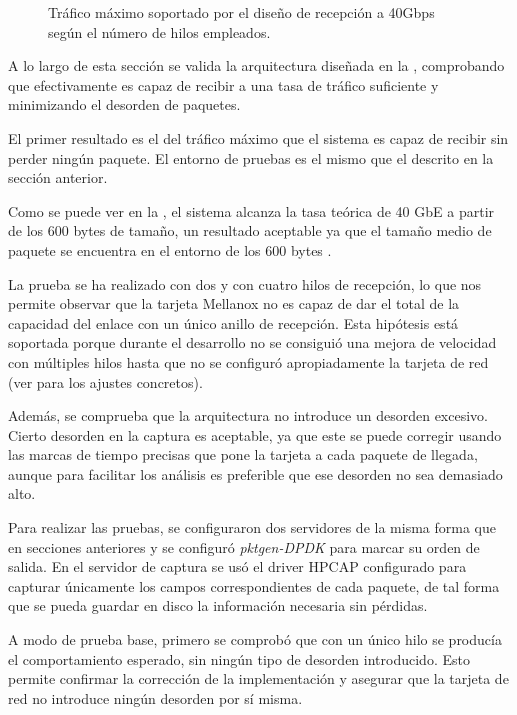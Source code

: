 \documentclass[oneside, draft]{epstfg}
\begin{document}
\begin{figure}[b]
\caption[Capacidad del diseño de recepción a 40 Gbps]{Tráfico máximo soportado por el diseño de recepción a 40Gbps según el número de hilos empleados.}
\label{fig:Validacion:MulticoreMaxRate}
\end{figure}

A lo largo de esta sección se valida la arquitectura diseñada en la , comprobando que efectivamente es capaz de recibir a una tasa de tráfico suficiente y minimizando el desorden de paquetes.

El primer resultado es el del tráfico máximo que el sistema es capaz de recibir sin perder ningún paquete. El entorno de pruebas es el mismo que el descrito en la sección anterior.

Como se puede ver en la , el sistema alcanza la tasa teórica de 40 GbE a partir de los 600 bytes de tamaño, un resultado aceptable ya que el tamaño medio de paquete se encuentra en el entorno de los 600 bytes \cite{john2007analysis}.

La prueba se ha realizado con dos y con cuatro hilos de recepción, lo que nos permite observar que la tarjeta Mellanox no es capaz de dar el total de la capacidad del enlace con un único anillo de recepción. Esta hipótesis está soportada porque durante el desarrollo no se consiguió una mejora de velocidad con múltiples hilos hasta que no se configuró apropiadamente la tarjeta de red (ver  para los ajustes concretos).

Además, se comprueba que la arquitectura no introduce un desorden excesivo. Cierto desorden en la captura es aceptable, ya que este se puede corregir usando las marcas de tiempo precisas que pone la tarjeta a cada paquete de llegada, aunque para facilitar los análisis es preferible que ese desorden no sea demasiado alto.

Para realizar las pruebas, se configuraron dos servidores de la misma forma que en secciones anteriores y se configuró \textit{pktgen-DPDK} para marcar su orden de salida. En el servidor de captura se usó el driver HPCAP configurado para capturar únicamente los campos correspondientes de cada paquete, de tal forma que se pueda guardar en disco la información necesaria sin pérdidas.

A modo de prueba base, primero se comprobó que con un único hilo se producía el comportamiento esperado, sin ningún tipo de desorden introducido. Esto permite confirmar la corrección de la implementación y asegurar que la tarjeta de red no introduce ningún desorden por sí misma.
\end{document}
